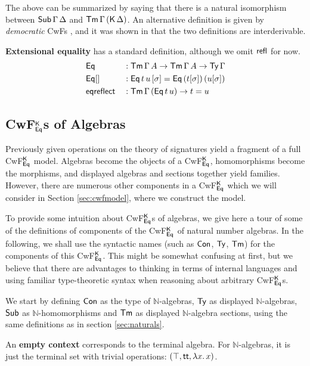\documentclass[acmsmall,screen]{acmart}
\begin{document}
The above can be summarized by saying that there is a natural isomorphism
between $\Tms\,\Gamma\,\Delta$ and $\Tm\,\Gamma\,(\K\,\Delta)$. An
alternative definition is given by \emph{democratic} CwFs
\cite{clairambault2014biequivalence}, and it was shown in
\cite{forsberg-phd} that the two definitions are interderivable.

\textbf{Extensional equality} has a standard definition, although we omit $\refl$ for now.
\begin{alignat*}{5}
  & \Eq      && : \Tm\,\Gamma\,A \ra \Tm\,\Gamma\,A \ra \Ty\,\Gamma \\
  & \Eq[]    && : \Eq\,t\,u\,[\sigma] = \Eq\,(t[\sigma])\,(u[\sigma]) \\
  & \eqreflect && : \Tm\,\Gamma\,(\Eq\,t\,u) \ra t = u
\end{alignat*}

\subsection{CwF$^\K_{\Eq}$s of Algebras}
\label{sec:cwfalg}

Previously given operations on the theory of signatures yield a
fragment of a full CwF$^\K_{\Eq}$ model. Algebras become the objects
of a CwF$^\K_{\Eq}$, homomorphisms become the morphisms, and displayed
algebras and sections together yield families. However, there are
numerous other components in a CwF$^\K_{\Eq}$ which we will consider
in Section \ref{sec:cwfmodel}, where we construct the model.

To provide some intuition about CwF$^\K_{\Eq}$s of algebras, we give
here a tour of some of the definitions of components of the
CwF$^\K_{\Eq}$ of natural number algebras. In the following, we shall
use the syntactic names (such as $\Con$, $\Ty$, $\Tm$) for the
components of this CwF$^\K_{\Eq}$. This might be somewhat confusing at
first, but we believe that there are advantages to thinking in terms
of internal languages and using familiar type-theoretic syntax when
reasoning about arbitrary CwF$^\K_{\Eq}$s.

We start by defining $\Con$ as the type of $\mathbb{N}$-algebras,
$\Ty$ as displayed $\mathbb{N}$-algebras, $\Tms$ as
$\mathbb{N}$-homomorphisms and $\Tm$ as displayed
$\mathbb{N}$-algebra sections, using the same definitions as in section
\ref{sec:naturals}.

An \textbf{empty context} corresponds to the terminal algebra.  For
$\mathbb{N}$-algebras, it is just the terminal set with trivial
operations: $(\top, \tt, \lambda x.\,x)$.
\end{document}
